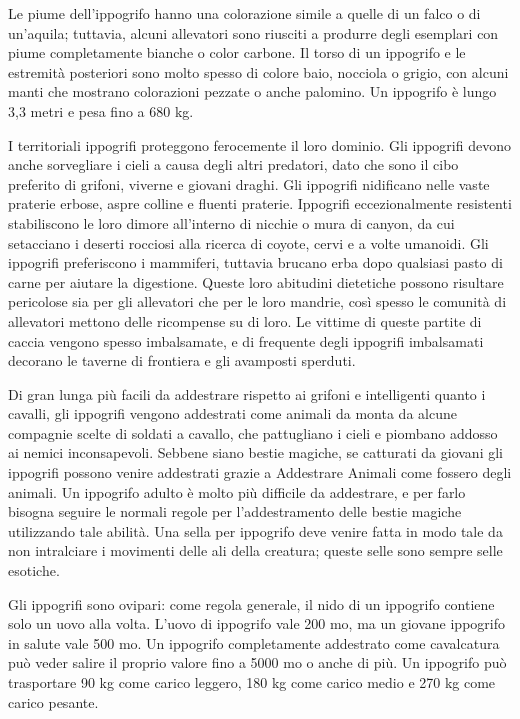 \begin{multicols}{2}
Le piume dell'ippogrifo hanno una colorazione simile a quelle di un falco o di un'aquila; tuttavia, alcuni allevatori sono riusciti a produrre degli esemplari con piume completamente bianche o color carbone. Il torso di un ippogrifo e le estremità posteriori sono molto spesso di colore baio, nocciola o grigio, con alcuni manti che mostrano colorazioni pezzate o anche palomino. Un ippogrifo è lungo 3,3 metri e pesa fino a 680 kg.

I territoriali ippogrifi proteggono ferocemente il loro dominio. Gli ippogrifi devono anche sorvegliare i cieli a causa degli altri predatori, dato che sono il cibo preferito di grifoni, viverne e giovani draghi. Gli ippogrifi nidificano nelle vaste praterie erbose, aspre colline e fluenti praterie. Ippogrifi eccezionalmente resistenti stabiliscono le loro dimore all'interno di nicchie o mura di canyon, da cui setacciano i deserti rocciosi alla ricerca di coyote, cervi e a volte umanoidi. Gli ippogrifi preferiscono i mammiferi, tuttavia brucano erba dopo qualsiasi pasto di carne per aiutare la digestione. Queste loro abitudini dietetiche possono risultare pericolose sia per gli allevatori che per le loro mandrie, così spesso le comunità di allevatori mettono delle ricompense su di loro. Le vittime di queste partite di caccia vengono spesso imbalsamate, e di frequente degli ippogrifi imbalsamati decorano le taverne di frontiera e gli avamposti sperduti.

Di gran lunga più facili da addestrare rispetto ai grifoni e intelligenti quanto i cavalli, gli ippogrifi vengono addestrati come animali da monta da alcune compagnie scelte di soldati a cavallo, che pattugliano i cieli e piombano addosso ai nemici inconsapevoli. Sebbene siano bestie magiche, se catturati da giovani gli ippogrifi possono venire addestrati grazie a Addestrare Animali come fossero degli animali. Un ippogrifo adulto è molto più difficile da addestrare, e per farlo bisogna seguire le normali regole per l'addestramento delle bestie magiche utilizzando tale abilità. Una sella per ippogrifo deve venire fatta in modo tale da non intralciare i movimenti delle ali della creatura; queste selle sono sempre selle esotiche.

Gli ippogrifi sono ovipari: come regola generale, il nido di un ippogrifo contiene solo un uovo alla volta. L'uovo di ippogrifo vale 200 mo, ma un giovane ippogrifo in salute vale 500 mo. Un ippogrifo completamente addestrato come cavalcatura può veder salire il proprio valore fino a 5000 mo o anche di più. Un ippogrifo può trasportare 90 kg come carico leggero, 180 kg come carico medio e 270 kg come carico pesante.



\end{multicols}
